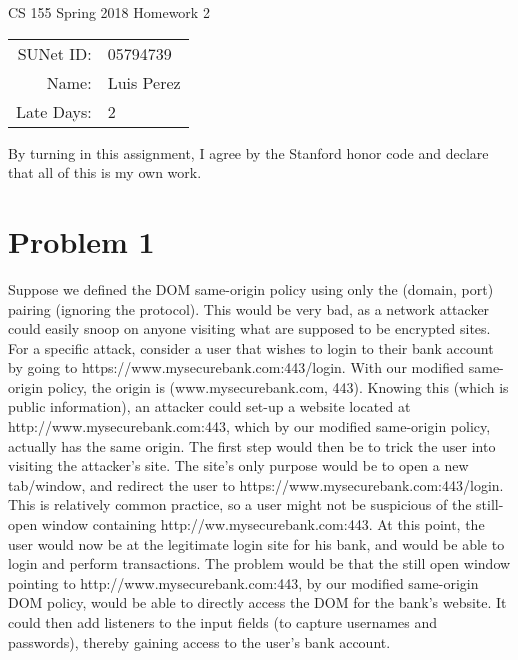 \documentclass[12pt]{article}
\begin{document}
\begin{center}
{\Large CS 155 Spring 2018 Homework 2}

\begin{tabular}{rl}
SUNet ID: & 05794739 \\
Name: & Luis Perez \\
Late Days: & 2
\end{tabular}
\end{center}

By turning in this assignment, I agree by the Stanford honor code and declare
that all of this is my own work.

\section*{Problem 1}
Suppose we defined the DOM same-origin policy using only the (domain, port) pairing (ignoring the protocol). This would be very bad, as a network attacker could easily snoop on anyone visiting what are supposed to be encrypted sites. For a specific attack, consider a user that wishes to login to their bank account by going to https://www.mysecurebank.com:443/login. With our modified same-origin policy, the origin is (www.mysecurebank.com, 443). Knowing this (which is public information), an attacker could set-up a website located at \\http://www.mysecurebank.com:443, which by our modified same-origin policy, actually has the same origin. The first step would then be to trick the user into visiting the attacker's site. The site's only purpose would be to open a new tab/window, and redirect the user to https://www.mysecurebank.com:443/login. This is relatively common practice, so a user might not be suspicious of the still-open window containing http://ww.mysecurebank.com:443. At this point, the user would now be at the legitimate login site for his bank, and would be able to login and perform transactions. The problem would be that the still open window pointing to http://www.mysecurebank.com:443, by our modified same-origin DOM policy, would be able to directly access the DOM for the bank's website. It could then add listeners to the input fields (to capture usernames and passwords), thereby gaining access to the user's bank account.

\pagebreak
\end{document}
